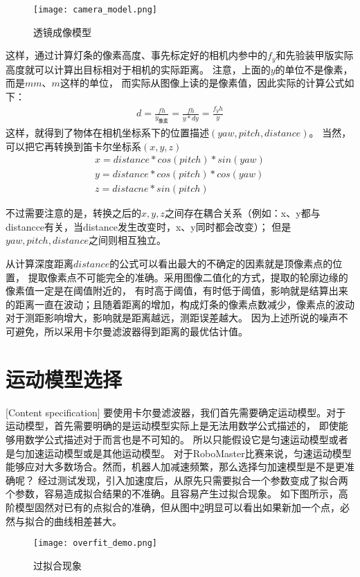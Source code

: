 \begin{figure}[H]
    \centering
    \texttt{[image: camera\_model.png]} 
    \caption{透镜成像模型}
    \label{透镜成像模型} 
\end{figure}    
这样，通过计算灯条的像素高度、事先标定好的相机内参中的$f_y$和先验装甲版实际高度就可以计算出目标相对于相机的实际距离。
注意，上面的$y$的单位不是像素，而是$mm$、$m$这样的单位，
而实际从图像上读的是像素值，因此实际的计算公式如下：
\begin{gather}
    d=\frac{fh}{y_{像素}}=\frac{fh}{y*dy}=\frac{f_yh}{y}
\end{gather}
这样，就得到了物体在相机坐标系下的位置描述$(yaw,pitch, distance)$。
当然，可以把它再转换到笛卡尔坐标系$(x,y,z)$
\begin{gather}
    x = distance*cos(pitch)*sin(yaw) \\
    y = distance*cos(pitch)*cos(yaw) \\
    z = distacne * sin(pitch)
\end{gather} \par
不过需要注意的是，转换之后的$x,y,z$之间存在耦合关系（例如：x、y都与distancce有关，当distance发生改变时，x、y同时都会改变）；
但是$yaw,pitch,distance$之间则相互独立。\par

从计算深度距离$distance$的公式可以看出最大的不确定的因素就是顶像素点的位置，
提取像素点不可能完全的准确。采用图像二值化的方式，提取的轮廓边缘的像素值一定是在阈值附近的，
有时高于阈值，有时低于阈值，影响就是结算出来的距离一直在波动；且随着距离的增加，构成灯条的像素点数减少，像素点的波动对于测距影响增大，影响就是距离越远，测距误差越大。
因为上述所说的噪声不可避免，所以采用卡尔曼滤波器得到距离的最优估计值。\par

\section{运动模型选择}[Content specification]
要使用卡尔曼滤波器，我们首先需要确定运动模型。对于运动模型，首先需要明确的是运动模型实际上是无法用数学公式描述的，
即使能够用数学公式描述对于而言也是不可知的。 所以只能假设它是匀速运动模型或者是匀加速运动模型或是其他运动模型。
对于RoboMaster比赛来说，匀速运动模型能够应对大多数场合。然而，机器人加减速频繁，那么选择匀加速模型是不是更准确呢？ 
经过测试发现，引入加速度后，从原先只需要拟合一个参数变成了拟合两个参数，容易造成拟合结果的不准确。且容易产生过拟合现象。
如下图所示，高阶模型固然对已有的点拟合的准确，但从图中\ref{过拟合现象}明显可以看出如果新加一个点，必然与拟合的曲线相差甚大。
\begin{figure}[H]
    \centering
    \texttt{[image: overfit\_demo.png]} 
    \caption{过拟合现象} 
    \label{过拟合现象} 
\end{figure} 

